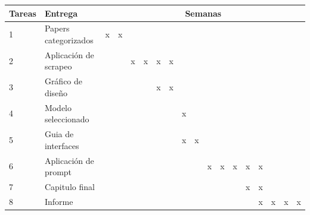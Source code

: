 \documentclass[12pt]{article}
\begin{document}
\begin{table}[h]
\centering
\begin{tabular}{|l|l|c|c|c|c|c|c|c|c|c|c|c|c|c|c|c|c|}
\hline
\textbf{Tareas} & \textbf{Entrega} & \multicolumn{16}{c|}{\textbf{Semanas}} \\
\hline
 1 & Papers categorizados & x & x & & & & & & & & & & & & & &\\
\hline
 2 & Aplicación de scrapeo & & & x & x & x & x & & & & & & & & & & \\
\hline
 3 & Gráfico de diseño & & & & & x & x & & & & & & & & & & \\
\hline
 4 & Modelo seleccionado & & & & & & & x & & & & & & & & & \\
\hline
 5 & Guia de interfaces & & & & & & &x & x & & & & & & & &\\
\hline
 6 & Aplicación de prompt & & & & & & & & &x &x &x &x &x & & & \\
\hline
 7 & Capitulo final & & & & & & & & & & & & x&x & & & \\
\hline
 8 & Informe & & & & & & & & & & & & &x &x &x & x \\
\hline
\end{tabular}
\end{table}




\end{document}
